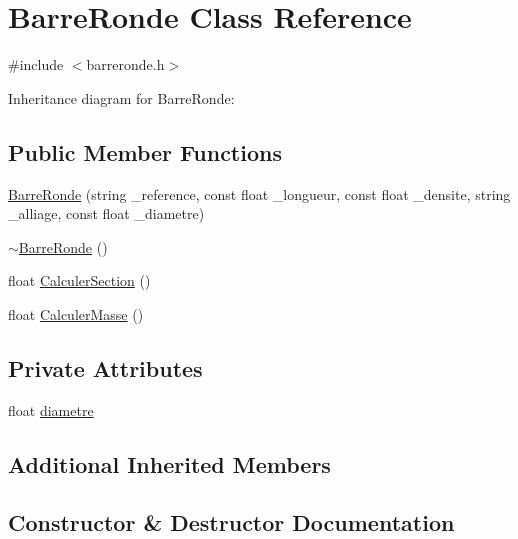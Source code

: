 \hypertarget{class_barre_ronde}{}\section{Barre\+Ronde Class Reference}
\label{class_barre_ronde}


{\ttfamily \#include $<$barreronde.\+h$>$}



Inheritance diagram for Barre\+Ronde\+:
\subsection*{Public Member Functions}
\begin{DoxyCompactItemize}
\item 
\hyperlink{class_barre_ronde_acfab06db7bd79ffad4be195f7f44835d}{Barre\+Ronde} (string \+\_\+reference, const float \+\_\+longueur, const float \+\_\+densite, string \+\_\+alliage, const float \+\_\+diametre)
\item 
\hyperlink{class_barre_ronde_aa62c3c350d2153aefcab64a20a6a795a}{$\sim$\+Barre\+Ronde} ()
\item 
float \hyperlink{class_barre_ronde_aa405f0463a7681f80a66da91c1d310a9}{Calculer\+Section} ()
\item 
float \hyperlink{class_barre_ronde_a450c58e2bfcb1300339f1c790740e5ad}{Calculer\+Masse} ()
\end{DoxyCompactItemize}
\subsection*{Private Attributes}
\begin{DoxyCompactItemize}
\item 
float \hyperlink{class_barre_ronde_ac1df0f24c2bbbb4fdb9533fa94639e92}{diametre}
\end{DoxyCompactItemize}
\subsection*{Additional Inherited Members}


\subsection{Constructor \& Destructor Documentation}
\mbox{\label{class_barre_ronde_acfab06db7bd79ffad4be195f7f44835d}} 
